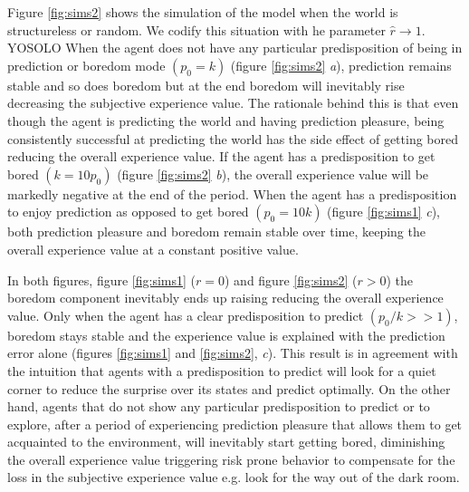 \documentclass[11pt, onecolumn]{article}
\begin{document}
Figure \ref{fig:sims2} shows the simulation of the model when the world is structureless or random.  We codify this situation with he parameter $\hat{r} \to 1$.  YOSOLO 
When the agent does not have any particular predisposition of being in prediction or boredom mode $(p_0 = k)$ (figure \ref{fig:sims2} \emph{a}), prediction remains stable and so does boredom but at the end boredom will inevitably rise decreasing the subjective experience value. The rationale behind this is that even though the agent is predicting the world and having prediction pleasure, being consistently successful at predicting the world has the side effect of getting bored reducing the overall experience value. 
If the agent has a predisposition to  get bored $(k = 10p_0)$ (figure \ref{fig:sims2} \emph{b}), the overall experience value will be markedly negative at the end of the period. When the agent has a predisposition to enjoy prediction as opposed to get bored $(p_0 = 10k)$ (figure \ref{fig:sims1} \emph{c}), both prediction pleasure and boredom remain stable over time, keeping the overall experience value at a constant positive value.







In both figures, figure \ref{fig:sims1} ($r=0$) and figure \ref{fig:sims2} ($r>0$) the boredom component inevitably ends up raising reducing the overall experience value. Only when the agent has a clear predisposition to predict $(p_0/k >> 1)$, boredom stays stable and the experience value is explained with the prediction error alone (figures \ref{fig:sims1} and \ref{fig:sims2}, \emph{c}). This result is in agreement with the intuition that agents with a predisposition to predict will look for a quiet corner to reduce the surprise over its states and predict optimally. On the other hand, agents that do not show any particular predisposition to predict or to explore, after a period of experiencing prediction pleasure that allows them to get acquainted to the environment, will inevitably start getting bored, diminishing the overall experience value triggering risk prone behavior to compensate for the loss in the subjective experience value e.g. look for the way out of the dark room.
\end{document}
